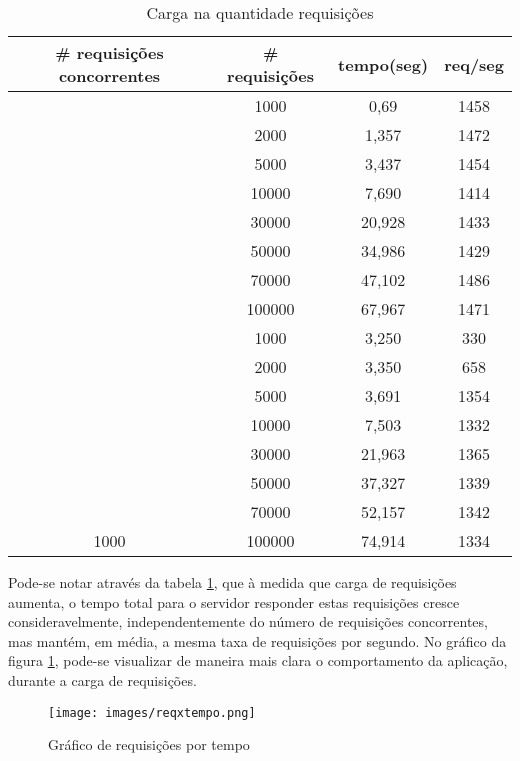 \begin{table}[ht]
\centering
\begin{tabular}{|c|c|c|c|}
\hline
\rowcolor[HTML]{CFCFCF} 
\# requisições concorrentes & \# requisições & tempo(seg) & req/seg      \\ \hline
\rowcolor[HTML]{EFEFEF} 
\cellcolor[HTML]{EFEFEF} & 1000 & 0,69 & 1458  \\ \cline{2-4}
\rowcolor[HTML]{EFEFEF} 
\cellcolor[HTML]{EFEFEF} & 2000 & 1,357 & 1472  \\ \cline{2-4}
\rowcolor[HTML]{EFEFEF} 
\cellcolor[HTML]{EFEFEF} & 5000           & 3,437      & 1454  \\ \cline{2-4} 
\rowcolor[HTML]{EFEFEF} 
\cellcolor[HTML]{EFEFEF} & 10000          & 7,690      & 1414  \\ \cline{2-4} 
\rowcolor[HTML]{EFEFEF} 
\cellcolor[HTML]{EFEFEF} & 30000          & 20,928     & 1433  \\ \cline{2-4} 
\rowcolor[HTML]{EFEFEF} 
\cellcolor[HTML]{EFEFEF} & 50000          & 34,986     & 1429  \\ \cline{2-4} 
\rowcolor[HTML]{EFEFEF} 
\cellcolor[HTML]{EFEFEF} & 70000          & 47,102     & 1486  \\ \cline{2-4} 
\rowcolor[HTML]{EFEFEF}
\multirow{-8}{*}{\cellcolor[HTML]{EFEFEF}100} & 100000 & 67,967     & 1471  \\ \hline
    & 1000           & 3,250      & 330   \\ \cline{2-4} 
    & 2000           & 3,350      & 658   \\ \cline{2-4} 
    & 5000           & 3,691      & 1354  \\ \cline{2-4} 
    & 10000          & 7,503      & 1332  \\ \cline{2-4} 
    & 30000          & 21,963     & 1365  \\ \cline{2-4} 
    & 50000          & 37,327     & 1339  \\ \cline{2-4} 
    & 70000          & 52,157     & 1342  \\ \cline{2-4} 
\multirow{-8}{*}{1000}   & 100000         & 74,914     & 1334  \\ \hline    
\end{tabular}
\caption{Carga na quantidade requisições}
\label{fig: Carga na quantidade requisições}
\end{table}

Pode-se notar através da tabela \ref{fig: Carga na quantidade requisições}, que à medida que carga de requisições aumenta, o tempo  total para o servidor responder estas requisições cresce consideravelmente, independentemente do número de requisições concorrentes, mas mantém, em média, a mesma taxa de requisições por segundo. No gráfico da figura \ref{fig: Gráfico de requisições por tempo}, pode-se visualizar de maneira mais clara o comportamento da aplicação, durante a carga de requisições.  
    \begin{figure}[htb]
    \centering
    \texttt{[image: images/reqxtempo.png]}
    \caption{Gráfico de requisições por tempo}
    \label{fig: Gráfico de requisições por tempo}
    \end{figure}

